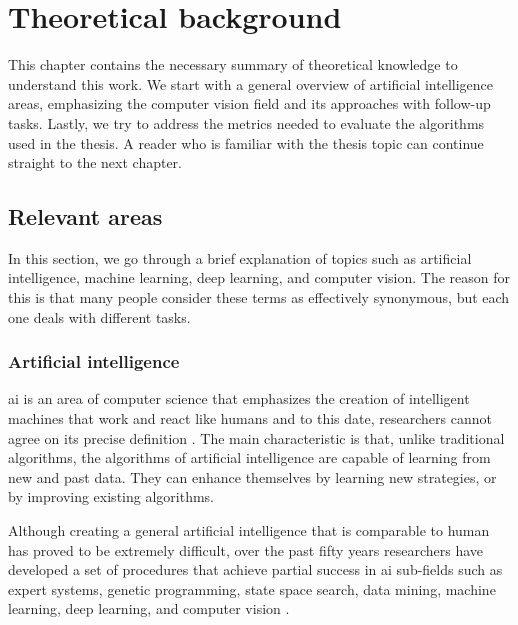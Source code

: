\chapter{Theoretical background}
    This chapter contains the necessary summary of theoretical knowledge to understand this work. We start with a general overview of artificial intelligence areas, emphasizing the computer vision field and its approaches with follow-up tasks. Lastly, we try to address the metrics needed to evaluate the algorithms used in the thesis. A reader who is familiar with the thesis topic can continue straight to the next chapter.

\section{Relevant areas}
    In this section, we go through a brief explanation of topics such as artificial intelligence, machine learning, deep learning, and computer vision. The reason for this is that many people consider these terms as effectively synonymous, but each one deals with different tasks.
    
    \subsection{Artificial intelligence}
        \Gls{ai} is an area of computer science that emphasizes the creation of intelligent machines that work and react like humans and to this date, researchers cannot agree on its precise definition \cite{dobrev2012definition}. The main characteristic is that, unlike traditional algorithms, the algorithms of artificial intelligence are capable of learning from new and past data. They can enhance themselves by learning new strategies, or by improving existing algorithms.
        
        Although creating a general artificial intelligence that is comparable to human has proved to be extremely difficult, over the past fifty years researchers have developed a set of procedures that achieve partial success in \gls{ai} sub-fields such as expert systems, genetic programming, state space search, data mining, machine learning, deep learning, and computer vision \cite{hutter2004universal}.
    
